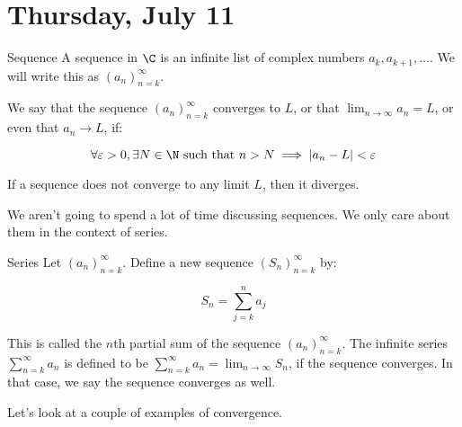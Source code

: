 \section{Thursday, July 11}


\begin{defbo}{Sequence}{} A sequence in $\C$ is an infinite list of complex numbers $a_k,a_{k+1},\dots$. We will write this as $(a_n)_{n = k}^\infty$.

We say that the sequence $(a_n)_{n = k}^\infty$ converges to $L$, or that $\lim_{n\rightarrow \infty} a_n = L$, or even that $a_n \rightarrow L$, if:

$$\forall \varepsilon > 0, \exists N\in \N \text{ such that } n > N \implies |a_n - L|< \varepsilon$$

If a sequence does not converge to any limit $L$, then it diverges.
\end{defbo}

We aren't going to spend a lot of time discussing sequences. We only care about them in the context of series.

\begin{defbo}{Series}{} Let $(a_n)_{n = k}^\infty$. Define a new sequence $(S_n)_{n = k}^\infty$ by:

$$S_n  = \sum_{j = k}^n a_j$$

This is called the $n$th partial sum of the sequence $(a_n)_{n = k}^\infty$. The infinite series $\sum_{n = k}^\infty a_n$ is defined to be $\sum_{n = k}^\infty a_n = \lim_{n \rightarrow \infty} S_n$, if the sequence converges. In that case, we say the sequence converges as well.
\end{defbo}

Let's look at a couple of examples of convergence.

